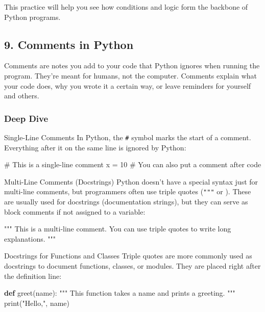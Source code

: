 \documentclass[
  letterpaper,
  DIV=11,
  numbers=noendperiod]{scrreprt}
\newenvironment{Shaded}{\begin{snugshade}}{\end{snugshade}}
\newcommand{\BuiltInTok}[1]{\textcolor[rgb]{0.00,0.23,0.31}{#1}}
\newcommand{\CommentTok}[1]{\textcolor[rgb]{0.37,0.37,0.37}{#1}}
\newcommand{\DecValTok}[1]{\textcolor[rgb]{0.68,0.00,0.00}{#1}}
\newcommand{\KeywordTok}[1]{\textcolor[rgb]{0.00,0.23,0.31}{\textbf{#1}}}
\newcommand{\NormalTok}[1]{\textcolor[rgb]{0.00,0.23,0.31}{#1}}
\newcommand{\OperatorTok}[1]{\textcolor[rgb]{0.37,0.37,0.37}{#1}}
\newcommand{\StringTok}[1]{\textcolor[rgb]{0.13,0.47,0.30}{#1}}
\begin{document}
This practice will help you see how conditions and logic form the
backbone of Python programs.

\subsection{9. Comments in Python}\label{comments-in-python}

Comments are notes you add to your code that Python ignores when running
the program. They're meant for humans, not the computer. Comments
explain what your code does, why you wrote it a certain way, or leave
reminders for yourself and others.

\subsubsection{Deep Dive}\label{deep-dive-9}

Single-Line Comments In Python, the \texttt{\#} symbol marks the start
of a comment. Everything after it on the same line is ignored by Python:

\begin{Shaded}
\begin{Highlighting}[]
\CommentTok{\# This is a single{-}line comment}
\NormalTok{x }\OperatorTok{=} \DecValTok{10}  \CommentTok{\# You can also put a comment after code}
\end{Highlighting}
\end{Shaded}

Multi-Line Comments (Docstrings) Python doesn't have a special syntax
just for multi-line comments, but programmers often use triple quotes
(\texttt{"""} or
\texttt{\textquotesingle{}\textquotesingle{}\textquotesingle{}}). These
are usually used for docstrings (documentation strings), but they can
serve as block comments if not assigned to a variable:

\begin{Shaded}
\begin{Highlighting}[]
\CommentTok{"""}
\CommentTok{This is a multi{-}line comment.}
\CommentTok{You can use triple quotes}
\CommentTok{to write long explanations.}
\CommentTok{"""}
\end{Highlighting}
\end{Shaded}

Docstrings for Functions and Classes Triple quotes are more commonly
used as docstrings to document functions, classes, or modules. They are
placed right after the definition line:

\begin{Shaded}
\begin{Highlighting}[]
\KeywordTok{def}\NormalTok{ greet(name):}
    \CommentTok{"""}
\CommentTok{    This function takes a name}
\CommentTok{    and prints a greeting.}
\CommentTok{    """}
    \BuiltInTok{print}\NormalTok{(}\StringTok{"Hello,"}\NormalTok{, name)}
\end{Highlighting}
\end{Shaded}
\end{document}
